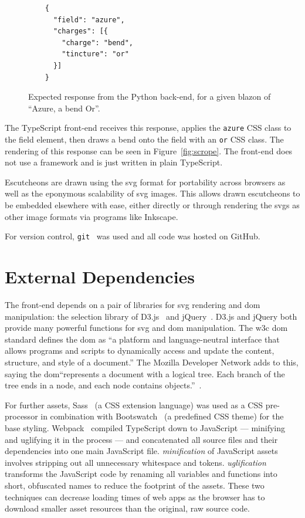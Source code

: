 \documentclass[nobib, a4paper, twoside, justified]{tufte-book}
\makeatletter
\newcommand{\svg}{\gls{svg}\@\xspace}
\newcommand{\svgs}{\glspl{svg}\@\xspace}
\newcommand{\dom}{\gls{dom}\@\xspace}
\newcommand{\blazon}{\gls{blazon}\@\xspace}
\makeatother
\begin{document}
\begin{figure}[h]
  \begin{verbatim}
    {
      "field": "azure",
      "charges": [{
        "charge": "bend",
        "tincture": "or"
      }]
    }
  \end{verbatim}
  \caption{Expected response from the Python back-end, for a given \blazon of ``Azure, a bend Or''.}%
  \label{fig:expected_output}
\end{figure}

\pagebreak%

The TypeScript front-end receives this response, applies the \texttt{azure} CSS class to the field
element, then draws a bend onto the field with an \texttt{or} CSS class. The rendering of this
response can be seen in Figure~\ref{fig:scrope}. The front-end does not use a framework and is just
written in plain TypeScript.

Escutcheons are drawn using the \svg format for portability across browsers as well as the
eponymous scalability of \svg images. This allows drawn escutcheons to be embedded elsewhere with
ease, either directly or through rendering the \svgs as other image formats via programs like
Inkscape.

For version control, \texttt{git}~\autocite{git} was used and all code was hosted on GitHub.

\section{External Dependencies}%
\label{sec:external_dependencies}

The front-end depends on a pair of libraries for \svg rendering and \dom manipulation: the
selection library of D3.js~\autocite{d3js} and jQuery~\autocite{jquery}. D3.js and jQuery both
provide many powerful functions for \svg and \dom manipulation.  The \gls{w3c} \dom standard
defines the \dom as ``a platform and language-neutral interface that allows programs and scripts to
dynamically access and update the content, structure, and style of a document.'' The Mozilla
Developer Network adds to this, saying the \dom ``represents a document with a logical tree. Each
branch of the tree ends in a node, and each node contains objects.''~\autocite{mdn_dom}.

For further assets, Sass~\autocite{sass-lang} (a CSS extension language) was used as a CSS
pre-processor in combination with Bootswatch~\autocite{bootswatch-flatly} (a predefined CSS theme)
for the base styling. Webpack~\autocite{webpack} compiled TypeScript down to JavaScript ---
minifying and uglifying it in the process --- and concatenated all source files and their
dependencies into one main JavaScript file. \textit{\Gls{minification}} of JavaScript assets
involves stripping out all unnecessary whitespace and tokens.  \textit{\Gls{uglification}}
transforms the JavaScript code by renaming all variables and functions into short, obfuscated names
to reduce the footprint of the assets. These two techniques can decrease loading times of web apps
as the browser has to download smaller asset resources than the original, raw source code.
\end{document}
